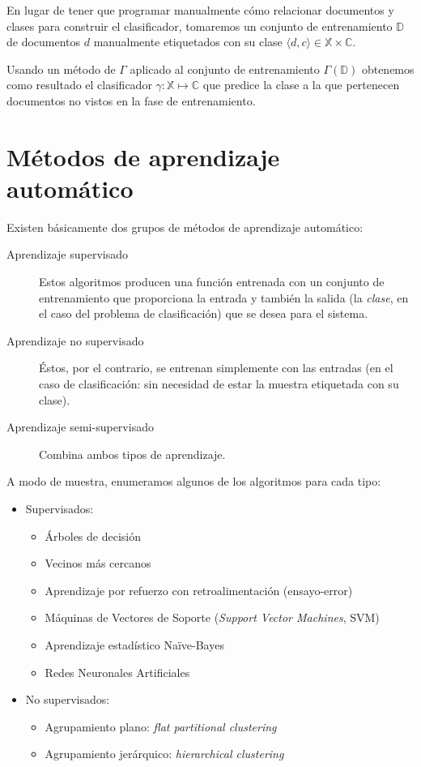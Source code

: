 En lugar de tener que programar manualmente cómo relacionar documentos y clases para construir el clasificador, tomaremos un conjunto de entrenamiento $\mathbb{D}$ de documentos $d$ manualmente etiquetados con su clase $\langle d, c \rangle \in \mathbb{X} \times \mathbb{C}$.

Usando un método de  $\Gamma$ aplicado al conjunto de entrenamiento $\Gamma(\mathbb{D})$ obtenemos como resultado el clasificador $\gamma : \mathbb{X} \mapsto \mathbb{C}$ \citep{Manning2008} que predice la clase a la que pertenecen documentos no vistos en la fase de entrenamiento.

\section{Métodos de aprendizaje automático}

Existen básicamente dos grupos de métodos de aprendizaje automático:
\nopagebreak
\begin{description}
\item[Aprendizaje supervisado] Estos algoritmos producen una función entrenada con un conjunto de entrenamiento que proporciona la entrada y también la salida (la \emph{clase}, en el caso del problema de clasificación) que se desea para el sistema.
\item[Aprendizaje no supervisado] Éstos, por el contrario, se entrenan simplemente con las entradas (en el caso de clasificación: sin necesidad de estar la muestra etiquetada con su clase).
\item[Aprendizaje semi-supervisado] Combina ambos tipos de aprendizaje.
\end{description}

A modo de muestra, enumeramos algunos de los algoritmos para cada tipo:
\nopagebreak
\begin{itemize}
\item Supervisados:
\begin{itemize}
\item Árboles de decisión
\item Vecinos más cercanos
\item Aprendizaje por refuerzo con retroalimentación (ensayo-error)
\item Máquinas de Vectores de Soporte (\emph{Support Vector Machines}, SVM)
\item Aprendizaje estadístico Naïve-Bayes
\item Redes Neuronales Artificiales
\end{itemize}
\item No supervisados:
\begin{itemize}
\item Agrupamiento plano: \emph{flat partitional clustering}
\item Agrupamiento jerárquico: \emph{hierarchical clustering}
\end{itemize}
\end{itemize}

